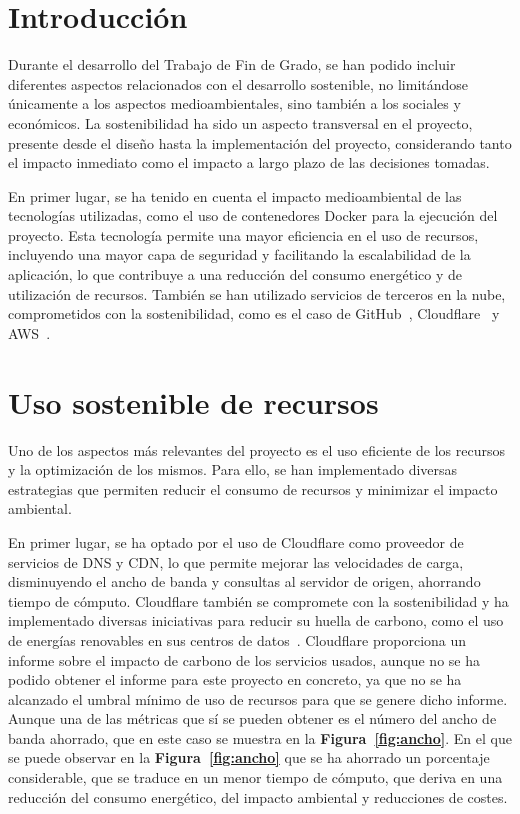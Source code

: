 
\section{Introducción}

Durante el desarrollo del Trabajo de Fin de Grado, se han podido incluir diferentes aspectos relacionados con el desarrollo sostenible, no limitándose únicamente a los aspectos medioambientales, sino también a los sociales y económicos. La sostenibilidad ha sido un aspecto transversal en el proyecto, presente desde el diseño hasta la implementación del proyecto, considerando tanto el impacto inmediato como el impacto a largo plazo de las decisiones tomadas.

En primer lugar, se ha tenido en cuenta el impacto medioambiental de las tecnologías utilizadas, como el uso de contenedores Docker para la ejecución del proyecto. Esta tecnología permite una mayor eficiencia en el uso de recursos, incluyendo una mayor capa de seguridad y facilitando la escalabilidad de la aplicación, lo que contribuye a una reducción del consumo energético y de utilización de recursos. También se han utilizado servicios de terceros en la nube, comprometidos con la sostenibilidad, como es el caso de GitHub~\cite{SosGithub}, Cloudflare~\cite{SosCloudflare} y AWS~\cite{SosAWS}.

\section{Uso sostenible de recursos}

Uno de los aspectos más relevantes del proyecto es el uso eficiente de los recursos y la optimización de los mismos. Para ello, se han implementado diversas estrategias que permiten reducir el consumo de recursos y minimizar el impacto ambiental.

En primer lugar, se ha optado por el uso de Cloudflare como proveedor de servicios de DNS y CDN, lo que permite mejorar las velocidades de carga, disminuyendo el ancho de banda y consultas al servidor de origen, ahorrando tiempo de cómputo. Cloudflare también se compromete con la sostenibilidad y ha implementado diversas iniciativas para reducir su huella de carbono, como el uso de energías renovables en sus centros de datos~\cite{SosCloudflare}. Cloudflare proporciona un informe sobre el impacto de carbono de los servicios usados, aunque no se ha podido obtener el informe para este proyecto en concreto, ya que no se ha alcanzado el umbral mínimo de uso de recursos para que se genere dicho informe. Aunque una de las métricas que sí se pueden obtener es el número del ancho de banda ahorrado, que en este caso se muestra en la \textbf{Figura~\ref{fig:ancho}}.
En el que se puede observar en la \textbf{Figura~\ref{fig:ancho}} que se ha ahorrado un porcentaje considerable, que se traduce en un menor tiempo de cómputo, que deriva en una reducción del consumo energético, del impacto ambiental y reducciones de costes.

